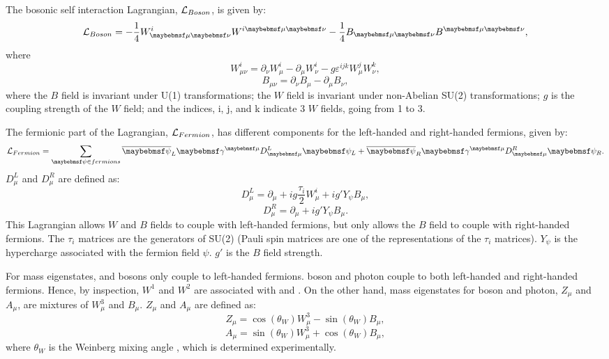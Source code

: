 The bosonic self interaction Lagrangian, $\operatorname{\mathcal{L}}_{Boson}$, is given by:
\begin{equation}
\Lagr_{Boson} = - \frac{1}{4} W^i_{\mu\nu} W^{i\mu\nu} - \frac{1}{4}B_{\mu\nu} B^{\mu\nu},
\end{equation}
where
\begin{equation}
W^i_{\mu\nu} = \partial_{\nu}W^i_{\mu} - \partial_{\mu}W^i_{\nu} - g\varepsilon^{ijk}W^j_{\mu}W^k_\nu ,
\end{equation}
\begin{equation}
B_{\mu\nu} = \partial_{\nu}B_{\mu} - \partial_{\mu}B_{\nu},
\end{equation}
where the $B$ field  is invariant under U(1) transformations; the $W$ field is invariant under non-Abelian SU(2) transformations; $g$ is the coupling strength of the $W$ field; and the indices, i, j, and k indicate 3 $W$ fields, going from 1 to 3.

The fermionic part of the Lagrangian,   $\operatorname{\mathcal{L}}_{Fermion}$, has different components for the left-handed and right-handed fermions, given by:
\begin{equation}
\Lagr_{Fermion} = \sum_{\psi\in{fermions}} {\overline{\psi}}_L \gamma^{\mu}D^L_{\mu} \psi_L +  \overline{\psi}_R \gamma^{\mu}D^R_{\mu} \psi_R .
\end{equation}
$D^L_{\mu}$ and $D^R_{\mu}$ are defined as:
\begin{equation}
D^L_{\mu} = \partial_{\mu} + ig\frac{\tau_i}{2}W^i_{\mu} + ig'Y_{\psi}B_{\mu} ,
\end{equation}
\begin{equation}
D^R_{\mu} = \partial_{\mu}  + ig'Y_{\psi}B_{\mu} .
\end{equation}
This Lagrangian allows $W$ and $B$ fields to couple with left-handed fermions, but only allows the $B$ field to couple with right-handed fermions. The $\tau_i$ matrices are the generators of SU(2) (Pauli spin matrices are one of the representations of the $\tau_i$ matrices). $Y_{\psi}$ is the hypercharge associated with the fermion field $\psi$. $g'$ is the $B$ field strength.

For mass eigenstates, \PWp and \PWm bosons only couple to left-handed fermions. \PZ boson and photon couple to both left-handed and right-handed fermions. Hence, by inspection, $W^1$ and $W^2$ are associated with \PWp and \PWm. On the other hand, mass eigenstates for \PZ boson and photon, $Z_{\mu}$ and $A_{\mu}$, are mixtures of $W^3_{\mu}$ and $B_{\mu}$. $Z_{\mu}$ and $A_{\mu}$ are defined as:
\begin{equation}
Z_{\mu} = \cos\left(\theta_W\right)W^3_{\mu} - \sin\left(\theta_W\right)B_{\mu},
\end{equation}
\begin{equation}
A_{\mu} = \sin\left(\theta_W\right)W^3_{\mu} + \cos\left(\theta_W\right)B_{\mu},
\end{equation}
where $\theta_W$ is the Weinberg mixing angle \cite{Weinberg:1967tq}, which is determined experimentally.

